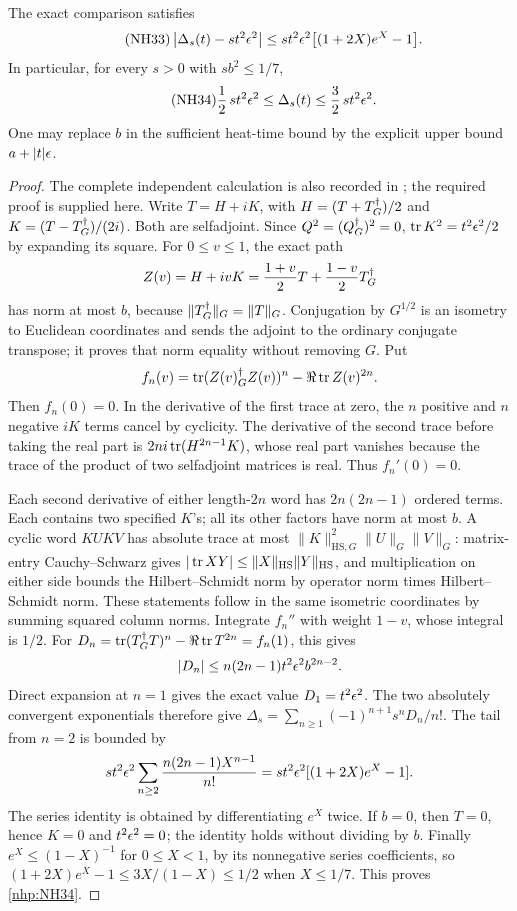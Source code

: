 \documentclass[11pt]{article}
\begin{document}
\begin{nhptheorem}
The exact comparison satisfies
\begin{equation}\tag{NH33}\label{nhp:NH33}
\left|\Delta_s(t)-st^2\epsilon^2\right|
\le st^2\epsilon^2\bigl[(1+2X)e^X-1\bigr].
\end{equation}
In particular, for every \(s>0\) with \(sb^2\le1/7\),
\begin{equation}\tag{NH34}\label{nhp:NH34}
\frac12\,st^2\epsilon^2\le\Delta_s(t)
\le\frac32\,st^2\epsilon^2 .
\end{equation}
One may replace \(b\) in the sufficient heat-time bound
by the explicit upper bound \(a+|t|\epsilon\).
\end{nhptheorem}
\begin{proof}
The complete independent calculation is also recorded
in \cite{nhp:MetricHeat}; the required proof is supplied here.
Write \(T=H+iK\), with
\(H=(T+T^\dagger_G)/2\) and \(K=(T-T^\dagger_G)/(2i)\).
Both are selfadjoint. Since \(Q^2=(Q^\dagger_G)^2=0\),
\(\operatorname{tr} K^2=t^2\epsilon^2/2\) by expanding its square.
For \(0\le v\le1\), the exact path
\[
Z(v)=H+ivK=\frac{1+v}{2}T+\frac{1-v}{2}T^\dagger_G
\]
has norm at most \(b\), because \(\|T^\dagger_G\|_G=\|T\|_G\).
Conjugation by \(G^{1/2}\) is an isometry to Euclidean
coordinates and sends the adjoint to the ordinary
conjugate transpose; it proves that norm equality
without removing \(G\).
Put
\[
f_n(v)=\operatorname{tr}(Z(v)^\dagger_G Z(v))^n-\Re\operatorname{tr} Z(v)^{2n}.
\]
Then \(f_n(0)=0\). In the derivative of the first
trace at zero, the \(n\) positive and \(n\) negative
\(iK\) terms cancel by cyclicity. The derivative of the
second trace before taking the real part is
\(2ni\operatorname{tr}(H^{2n-1}K)\), whose real part vanishes because
the trace of the product of two selfadjoint matrices
is real. Thus \(f_n'(0)=0\).

Each second derivative of either length-\(2n\) word
has \(2n(2n-1)\) ordered terms. Each contains two
specified \(K\)'s; all its other factors have norm at
most \(b\). A cyclic word \(KUKV\) has absolute trace
at most \(\|K\|_{\mathrm{HS},G}^2\|U\|_G\|V\|_G\):
matrix-entry Cauchy--Schwarz gives
\(|\operatorname{tr} XY|\le\|X\|_{\mathrm{HS}}\|Y\|_{\mathrm{HS}}\),
and multiplication on either side bounds the
Hilbert--Schmidt norm by operator norm times
Hilbert--Schmidt norm. These statements follow in the
same isometric coordinates by summing squared column
norms. Integrate \(f_n''\) with weight \(1-v\),
whose integral is \(1/2\). For
\(D_n=\operatorname{tr}(T^\dagger_G T)^n-\Re\operatorname{tr} T^{2n}=f_n(1)\), this gives
\[
|D_n|\le n(2n-1)t^2\epsilon^2 b^{2n-2}.
\]
Direct expansion at \(n=1\) gives the exact value
\(D_1=t^2\epsilon^2\).
The two absolutely convergent exponentials therefore give
\(\Delta_s=\sum_{n\ge1}(-1)^{n+1}s^nD_n/n!\).
The tail from \(n=2\) is bounded by
\[
st^2\epsilon^2
\sum_{n\ge2}\frac{n(2n-1)X^{n-1}}{n!}
=st^2\epsilon^2[(1+2X)e^X-1].
\]
The series identity is obtained by differentiating
\(e^X\) twice. If \(b=0\), then \(T=0\), hence
\(K=0\) and \(t^2\epsilon^2=0\); the identity holds without
dividing by \(b\). Finally \(e^X\le(1-X)^{-1}\) for
\(0\le X<1\), by its nonnegative series coefficients,
so \((1+2X)e^X-1\le3X/(1-X)\le1/2\) when
\(X\le1/7\). This proves \eqref{nhp:NH34}.
\end{proof}
\end{document}

